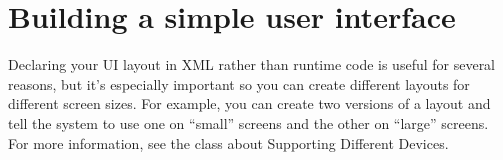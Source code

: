 \documentclass{article}
\begin{document}
\section{Building a simple user interface}
\label{sec:building-simple-user}

Declaring your UI layout in XML rather than runtime code is useful for
several reasons, but it's especially important so you can create
different layouts for different screen sizes. For example, you can
create two versions of a layout and tell the system to use one on
``small'' screens and the other on ``large'' screens. For more
information, see the class about Supporting Different Devices. 
\end{document}
